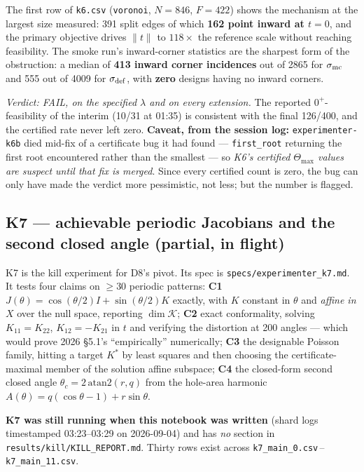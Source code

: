 \documentclass[10pt,a4paper]{article}
\newcommand{\fn}[1]{\nolinkurl{#1}}
\begin{document}
The first row of \fn{k6.csv} (\fn{voronoi}, $N=846$, $F=422$) shows the mechanism at the largest
size measured: 391 split edges of which \textbf{162 point inward at $t=0$}, and the primary
objective drives $\|t\|$ to $118\times$ the reference scale without reaching feasibility. The
smoke run's inward-corner statistics are the sharpest form of the obstruction: a median of
\textbf{413 inward corner incidences} out of 2865 for $\sigma_{\rm mc}$ and 555 out of 4009 for
$\sigma_{\rm def}$, with \textbf{zero} designs having no inward corners.

\emph{Verdict: FAIL, on the specified $\lambda$ and on every extension.} The reported
$0^+$-feasibility of the interim (10/31 at 01:35) is consistent with the final 126/400, and the
certified rate never left zero. \textbf{Caveat, from the session log:} \texttt{experimenter-k6b}
died mid-fix of a certificate bug it had found --- \fn{first_root} returning the first root
encountered rather than the smallest --- so \emph{K6's certified $\Theta_{\max}$ values are
suspect until that fix is merged}. Since every certified count is zero, the bug can only have
made the verdict more pessimistic, not less; but the number is flagged.

\subsection{K7 --- achievable periodic Jacobians and the second closed angle (partial, in flight)}

K7 is the kill experiment for D8's pivot. Its spec is \fn{specs/experimenter_k7.md}. It tests
four claims on $\ge30$ periodic patterns:
\textbf{C1} $J(\theta) = \cos(\theta/2)I + \sin(\theta/2)K$ exactly, with $K$ constant in
$\theta$ and \emph{affine in $X$} over the null space, reporting $\dim\mathcal K$;
\textbf{C2} exact conformality, solving $K_{11}=K_{22}$, $K_{12}=-K_{21}$ in $t$ and verifying
the distortion at 200 angles --- which would prove 2026 \S5.1's ``empirically'' numerically;
\textbf{C3} the designable Poisson family, hitting a target $K^*$ by least squares and then
choosing the certificate-maximal member of the solution affine subspace;
\textbf{C4} the closed-form second closed angle $\theta_c = 2\,\mathrm{atan2}(r,q)$ from the
hole-area harmonic $A(\theta) = q(\cos\theta - 1) + r\sin\theta$.

\textbf{K7 was still running when this notebook was written} (shard logs timestamped 03:23--03:29
on 2026-09-04) and has \emph{no} section in \fn{results/kill/KILL_REPORT.md}. Thirty rows exist
across \fn{k7_main_0.csv}\,--\,\fn{k7_main_11.csv}.
\end{document}
